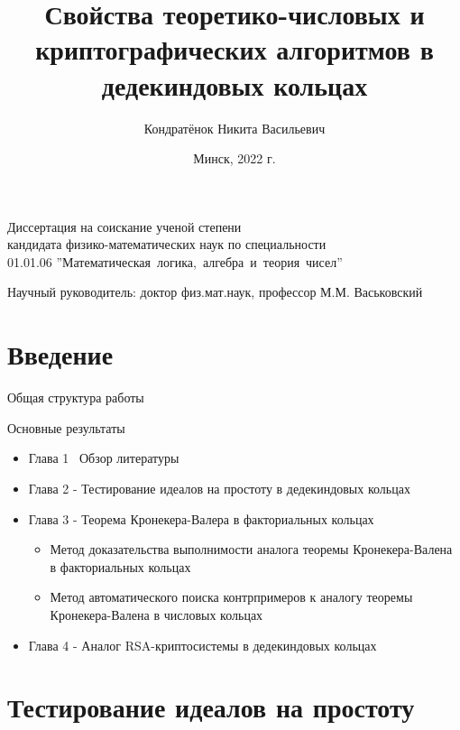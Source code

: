 \documentclass[8pt, xcolor=x11names]{beamer}
\author[Кондратёнок Н.В.]{Кондратёнок Никита Васильевич}
\title[]{Свойства теоретико-числовых и криптографических алгоритмов в дедекиндовых кольцах}
\date{Минск, 2022 г.}
\begin{document}
\begin{frame}
    \titlepage

    \begin{center}
        Диссертация на соискание ученой степени\\
        кандидата физико-математических наук по специальности\\
        01.01.06 ''Математическая~логика,~алгебра~и~теория~чисел''
    \end{center}

    \begin{center}
        Научный руководитель: доктор физ.мат.наук, профессор М.М. Васьковский
    \end{center}    
\end{frame}

\section{Введение}

\begin{frame}{Общая структура работы}
    \begin{block}{Основные результаты}
        \begin{itemize}
            \item Глава 1 \textendash\ Обзор литературы
            
            \item Глава 2 - Тестирование идеалов на простоту в дедекиндовых кольцах

            \item Глава 3 - Теорема Кронекера-Валера в факториальных кольцах
            \begin{itemize}
                \item Метод доказательства выполнимости аналога теоремы Кронекера-Валена в факториальных кольцах

                \item Метод автоматического поиска контрпримеров к аналогу теоремы Кронекера-Валена в числовых кольцах
            \end{itemize}
            
            \item Глава 4 - Аналог RSA-криптосистемы в дедекиндовых кольцах
        \end{itemize}
    \end{block}
\end{frame}

\section{Тестирование идеалов на простоту}
\end{document}
